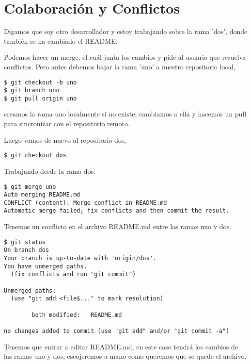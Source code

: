\documentclass{article}
\begin{document}
\section{Colaboraci\'{o}n y Conflictos}

Digamos que soy otro desarrollador y estoy trabajando sobre la rama 'dos',
donde tambi\'{e}n se ha cambiado el README.

Podemos hacer un merge, el cu\'{a}l
junta los cambios y pide al usuario que resuelva conflictos.
Pero antes debemos bajar la rama 'uno' a nuestro repositorio local,
\begin{verbatim}
$ git checkout -b uno 
$ git branch uno
$ git pull origin uno
\end{verbatim}
creamos la rama uno localmente si no existe, cambiamos a ella
y hacemos un pull para sincronizar con el repositorio remoto.

Luego vamos de nuevo al repositorio dos,
\begin{verbatim}
$ git checkout dos
\end{verbatim}

Trabajando desde la rama dos:
\begin{verbatim}
$ git merge uno
Auto-merging README.md
CONFLICT (content): Merge conflict in README.md
Automatic merge failed; fix conflicts and then commit the result.
\end{verbatim}

Tenemos un conflicto en el archivo README.md entre las ramas uno y dos.
\begin{verbatim}
$ git status 
On branch dos
Your branch is up-to-date with 'origin/dos'.
You have unmerged paths.
  (fix conflicts and run "git commit")

Unmerged paths:
  (use "git add <file$..." to mark resolution)

        both modified:   README.md

no changes added to commit (use "git add" and/or "git commit -a")
\end{verbatim}
Tenemos que entrar a editar README.md, 
en este caso tendr\'{a} los cambios de las ramas uno y dos,
escojeremos a mano como queremos que se quede el archivo.  
\end{document}
